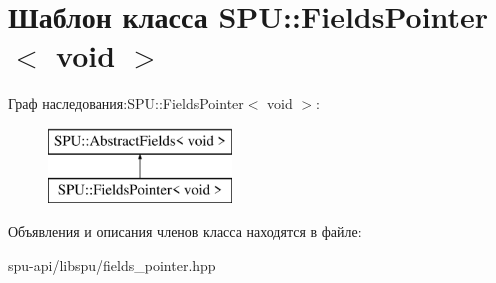 \hypertarget{class_s_p_u_1_1_fields_pointer_3_01void_01_4}{}\section{Шаблон класса S\+PU\+:\+:Fields\+Pointer$<$ void $>$}
\label{class_s_p_u_1_1_fields_pointer_3_01void_01_4}
Граф наследования\+:S\+PU\+:\+:Fields\+Pointer$<$ void $>$\+:\begin{figure}[H]
\begin{center}
\leavevmode
\includegraphics[height=2.000000cm]{class_s_p_u_1_1_fields_pointer_3_01void_01_4}
\end{center}
\end{figure}


Объявления и описания членов класса находятся в файле\+:\begin{DoxyCompactItemize}
\item 
spu-\/api/libspu/fields\+\_\+pointer.\+hpp\end{DoxyCompactItemize}
